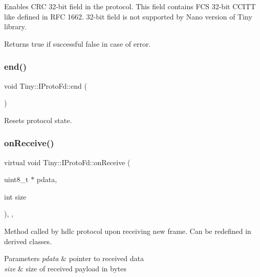 Enables C\+RC 32-\/bit field in the protocol. This field contains F\+CS 32-\/bit C\+C\+I\+TT like defined in R\+FC 1662. 32-\/bit field is not supported by Nano version of Tiny library. \begin{DoxyReturn}{Returns}
true if successful false in case of error. 
\end{DoxyReturn}
\mbox{\label{classTiny_1_1IProtoFd_ad17e76d0ef7ea40838e51acc2498c482}} 
\subsubsection{\texorpdfstring{end()}{end()}}
{\footnotesize\ttfamily void Tiny\+::\+I\+Proto\+Fd\+::end (\begin{DoxyParamCaption}{ }\end{DoxyParamCaption})}

Resets protocol state. \mbox{\label{classTiny_1_1IProtoFd_a795b41c969708964cd4646580af1c3ab}} 
\subsubsection{\texorpdfstring{on\+Receive()}{onReceive()}}
{\footnotesize\ttfamily virtual void Tiny\+::\+I\+Proto\+Fd\+::on\+Receive (\begin{DoxyParamCaption}\item[{uint8\+\_\+t $\ast$}]{pdata,  }\item[{int}]{size }\end{DoxyParamCaption})\hspace{0.3cm}{\ttfamily [inline]}, {\ttfamily [protected]}, {\ttfamily [virtual]}}

Method called by hdlc protocol upon receiving new frame. Can be redefined in derived classes. 
\begin{DoxyParams}{Parameters}
{\em pdata} & pointer to received data \\
\hline
{\em size} & size of received payload in bytes \\
\hline
\end{DoxyParams}
\mbox{\label{classTiny_1_1IProtoFd_a37292eb5c9faf1be8c4850985e0ae2eb}} 
